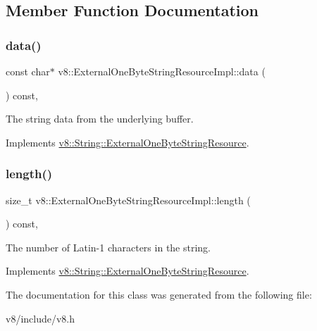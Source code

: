 \subsection{Member Function Documentation}
\mbox{\label{classv8_1_1ExternalOneByteStringResourceImpl_a417ecb5eb304b12c8806ff6d0306bc09}} 
\subsubsection{\texorpdfstring{data()}{data()}}
{\footnotesize\ttfamily const char$\ast$ v8\+::\+External\+One\+Byte\+String\+Resource\+Impl\+::data (\begin{DoxyParamCaption}{ }\end{DoxyParamCaption}) const\hspace{0.3cm}{\ttfamily [inline]}, {\ttfamily [virtual]}}

The string data from the underlying buffer. 

Implements \mbox{\hyperlink{classv8_1_1String_1_1ExternalOneByteStringResource_aaeca31240d3dbf990d1b974e3c64593e}{v8\+::\+String\+::\+External\+One\+Byte\+String\+Resource}}.

\mbox{\label{classv8_1_1ExternalOneByteStringResourceImpl_a4015ab4f74c209ac484e5183b2039f58}} 
\subsubsection{\texorpdfstring{length()}{length()}}
{\footnotesize\ttfamily size\+\_\+t v8\+::\+External\+One\+Byte\+String\+Resource\+Impl\+::length (\begin{DoxyParamCaption}{ }\end{DoxyParamCaption}) const\hspace{0.3cm}{\ttfamily [inline]}, {\ttfamily [virtual]}}

The number of Latin-\/1 characters in the string. 

Implements \mbox{\hyperlink{classv8_1_1String_1_1ExternalOneByteStringResource_ad6b702f05798bcfc3975cb922f32b5ab}{v8\+::\+String\+::\+External\+One\+Byte\+String\+Resource}}.



The documentation for this class was generated from the following file\+:\begin{DoxyCompactItemize}
\item 
v8/include/v8.\+h\end{DoxyCompactItemize}
